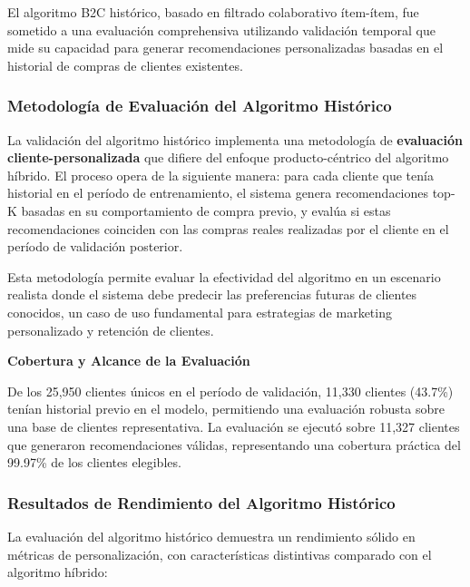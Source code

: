 \documentclass[twocolumn]{article}
\begin{document}
El algoritmo B2C histórico, basado en filtrado colaborativo ítem-ítem, fue sometido a una evaluación comprehensiva utilizando validación temporal que mide su capacidad para generar recomendaciones personalizadas basadas en el historial de compras de clientes existentes.

\subsubsection{Metodología de Evaluación del Algoritmo Histórico}

La validación del algoritmo histórico implementa una metodología de \textbf{evaluación cliente-personalizada} que difiere del enfoque producto-céntrico del algoritmo híbrido. El proceso opera de la siguiente manera: para cada cliente que tenía historial en el período de entrenamiento, el sistema genera recomendaciones top-K basadas en su comportamiento de compra previo, y evalúa si estas recomendaciones coinciden con las compras reales realizadas por el cliente en el período de validación posterior.

Esta metodología permite evaluar la efectividad del algoritmo en un escenario realista donde el sistema debe predecir las preferencias futuras de clientes conocidos, un caso de uso fundamental para estrategias de marketing personalizado y retención de clientes.

\textbf{Cobertura y Alcance de la Evaluación}

De los 25,950 clientes únicos en el período de validación, 11,330 clientes (43.7\%) tenían historial previo en el modelo, permitiendo una evaluación robusta sobre una base de clientes representativa. La evaluación se ejecutó sobre 11,327 clientes que generaron recomendaciones válidas, representando una cobertura práctica del 99.97\% de los clientes elegibles.

\subsubsection{Resultados de Rendimiento del Algoritmo Histórico}

La evaluación del algoritmo histórico demuestra un rendimiento sólido en métricas de personalización, con características distintivas comparado con el algoritmo híbrido:
\end{document}
